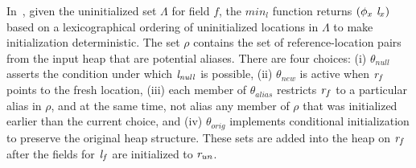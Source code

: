 In~, given the uninitialized set $\Lambda$ for
field $f$, the $\mathit{min}_l$ function returns
$(\phi_x\ \cfgnt{l}_x)$ based on a lexicographical ordering of
uninitialized locations in $\Lambda$ to make initialization
deterministic.  The set $\rho$ contains the set of reference-location
pairs from the input heap that are potential aliases.  There are four
choices: (i) $\theta_\mathit{null}$ asserts the condition under which
$\emph{l}_\mathit{null}$ is possible, (ii) $\theta_\mathit{new}$ is
active when $\emph{r}_f$ points to the fresh location, (iii) each
member of $\theta_\mathit{alias}$ restricts $\emph{r}_f$ to a
particular alias in $\rho$, and at the same time, not alias any member
of $\rho$ that was initialized earlier than the current choice, and
(iv) $\theta_\mathit{orig}$ implements conditional initialization to
preserve the original heap structure.  These sets are added into the
heap on $\emph{r}_f$ after the fields for $\emph{l}_f$ are
initialized to $\emph{r}_\mathit{un}$.

